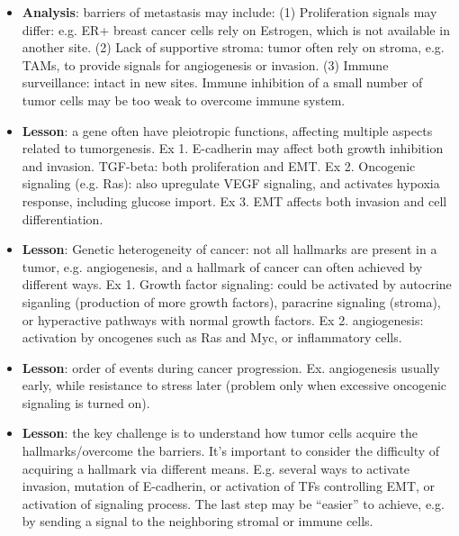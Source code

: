 \documentclass{report}
\begin{document}
\begin{itemize}
	\item \textbf{Analysis}: barriers of metastasis may include: (1) Proliferation signals may differ: e.g. ER+ breast cancer cells rely on Estrogen, which is not available in another site. (2) Lack of supportive stroma: tumor often rely on stroma, e.g. TAMs, to provide signals for angiogenesis or invasion. (3) Immune surveillance: intact in new sites. Immune inhibition of a small number of tumor cells may be too weak to overcome immune system. 
	
	\item \textbf{Lesson}: a gene often have pleiotropic functions, affecting multiple aspects related to tumorgenesis. Ex 1. E-cadherin may affect both growth inhibition and invasion. TGF-beta: both proliferation and EMT. Ex 2. Oncogenic signaling (e.g. Ras): also upregulate VEGF signaling, and activates hypoxia response, including glucose import. Ex 3. EMT affects both invasion and cell differentiation. 
	
	\item \textbf{Lesson}: Genetic heterogeneity of cancer: not all hallmarks are present in a tumor, e.g. angiogenesis, and a hallmark of cancer can often achieved by different ways. Ex 1. Growth factor signaling: could be activated by autocrine siganling (production of more growth factors), paracrine signaling (stroma), or hyperactive pathways with normal growth factors. Ex 2. angiogenesis: activation by oncogenes such as Ras and Myc, or inflammatory cells. 
	
	\item \textbf{Lesson}: order of events during cancer progression. Ex. angiogenesis usually early, while resistance to stress later (problem only when excessive oncogenic signaling is turned on). 
	
	\item \textbf{Lesson}: the key challenge is to understand how tumor cells acquire the hallmarks/overcome the barriers. It’s important to consider the difficulty of acquiring a hallmark via different means. E.g. several ways to activate invasion, mutation of E-cadherin, or activation of TFs controlling EMT, or activation of signaling process. The last step may be “easier” to achieve, e.g. by sending a signal to the neighboring stromal or immune cells. 
\end{itemize}
\end{document}
